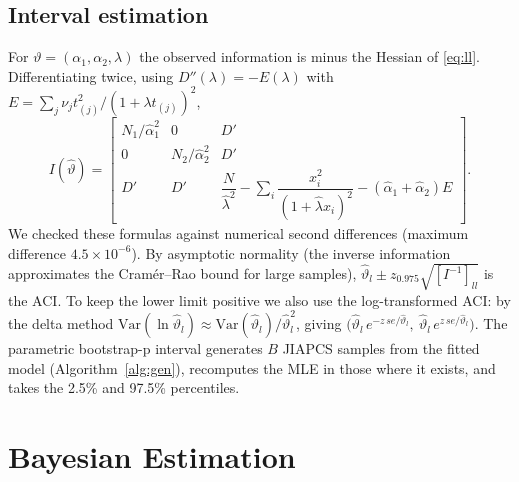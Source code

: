 \documentclass[a4paper,11pt]{article}
\begin{document}
\subsection{Interval estimation}
For $\vartheta=(\alpha_1,\alpha_2,\lambda)$ the observed information is minus the Hessian of \eqref{eq:ll}. Differentiating twice, using $D''(\lambda)=-E(\lambda)$ with $E=\sum_j\nu_jt_{(j)}^2/(1+\lambda t_{(j)})^2$,
\[
I(\hat\vartheta)=\begin{bmatrix}
N_1/\hat\alpha_1^2&0&D'\\
0&N_2/\hat\alpha_2^2&D'\\
D'&D'&\dfrac{N}{\hat\lambda^2}-\sum_i\dfrac{x_i^2}{(1+\hat\lambda x_i)^2}-(\hat\alpha_1+\hat\alpha_2)E
\end{bmatrix}.
\]
We checked these formulas against numerical second differences (maximum difference $4.5\times10^{-6}$). By asymptotic normality (the inverse information approximates the Cram\'er--Rao bound for large samples), $\hat\vartheta_l\pm z_{0.975}\sqrt{[I^{-1}]_{ll}}$ is the ACI. To keep the lower limit positive we also use the log-transformed ACI: by the delta method $\mathrm{Var}(\ln\hat\vartheta_l)\approx\mathrm{Var}(\hat\vartheta_l)/\hat\vartheta_l^2$, giving $\big(\hat\vartheta_l\,e^{-z\,se/\hat\vartheta_l},\ \hat\vartheta_l\,e^{z\,se/\hat\vartheta_l}\big)$. The parametric bootstrap-p interval generates $B$ JIAPCS samples from the fitted model (Algorithm~\ref{alg:gen}), recomputes the MLE in those where it exists, and takes the 2.5\% and 97.5\% percentiles.

\section{Bayesian Estimation}\label{sec3}
\end{document}
